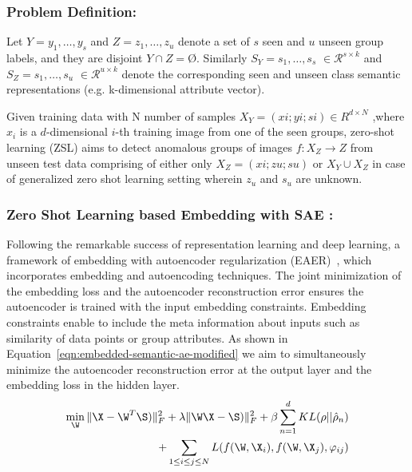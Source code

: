\subsubsection{Problem Definition:}
Let $Y={y_1,\dots,y_s}$ and $Z={z_1,\dots,z_u}$ denote a set of $s$ seen and $u$ unseen group
labels, and they are disjoint $Y \cap Z = $\O$ $. Similarly $S_Y={s_1,\dots,s_s}$ $\in \mathcal{R}^{s \times k}$ and $S_Z={s_1,\dots,s_u}$ $\in \mathcal{R}^{u \times k}$ denote the corresponding seen and unseen class semantic
representations (e.g. k-dimensional attribute vector).

Given training data with N number of samples $X_Y={(xi; yi; si)}  \in R^{d \times N}$
,where $x_i$ is a $d$-dimensional $i$-th training image from
one of the seen groups, zero-shot learning (ZSL) aims to detect
anomalous groups of images $f : X_Z \longrightarrow Z$
from unseen test data comprising of either only $X_Z= {(xi; zu; su)}$ or $X_Y \cup X_Z $ in case of generalized zero shot learning setting wherein $z_u$ and $s_u$ are unknown.

\subsubsection{ Zero Shot Learning based Embedding with SAE : }
Following the remarkable success of representation learning and deep learning,  a framework of embedding with autoencoder regularization (EAER)~\cite{yu2013embedding}, which incorporates embedding and autoencoding techniques. The joint minimization of the embedding loss and the autoencoder reconstruction error ensures the autoencoder is trained with the input embedding constraints. Embedding constraints enable to include the meta information about inputs such as similarity of data points or group attributes. As shown in Equation~\ref{eqn:embedded-semantic-ae-modified} we aim to simultaneously minimize the autoencoder reconstruction error at the output layer and the embedding loss in the hidden layer.
\begin{equation}
  \label{eqn:embedded-semantic-ae-modified}
  \begin{aligned}
  \min_{\W} \| \X - \W^T \S ) \|_F^2  + \lambda \| \W\X - \S ) \|_F^2 + \beta \sum_{n=1}^{d} KL(\rho||\hat\rho_n) \\
  + \sum_{1\leq i\leq j \leq N} L(f(\W,\X_i),f(\W,\X_j),\varphi_{ij}) \\
\end{aligned}
\end{equation}


